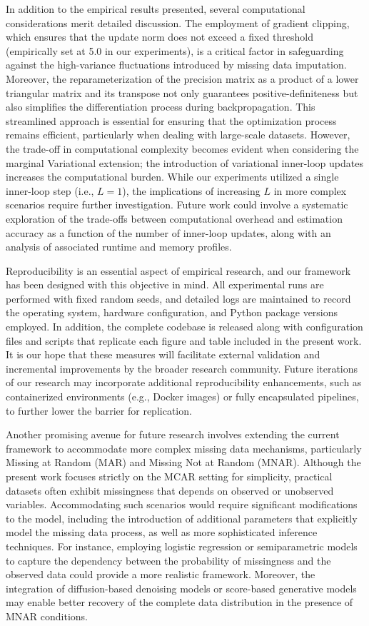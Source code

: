 \documentclass{article}
\begin{document}
In addition to the empirical results presented, several computational considerations merit detailed discussion. The employment of gradient clipping, which ensures that the update norm does not exceed a fixed threshold (empirically set at 5.0 in our experiments), is a critical factor in safeguarding against the high-variance fluctuations introduced by missing data imputation. Moreover, the reparameterization of the precision matrix as a product of a lower triangular matrix and its transpose not only guarantees positive-definiteness but also simplifies the differentiation process during backpropagation. This streamlined approach is essential for ensuring that the optimization process remains efficient, particularly when dealing with large-scale datasets. However, the trade-off in computational complexity becomes evident when considering the marginal Variational extension; the introduction of variational inner-loop updates increases the computational burden. While our experiments utilized a single inner-loop step (i.e., \(L=1\)), the implications of increasing \(L\) in more complex scenarios require further investigation. Future work could involve a systematic exploration of the trade-offs between computational overhead and estimation accuracy as a function of the number of inner-loop updates, along with an analysis of associated runtime and memory profiles.

Reproducibility is an essential aspect of empirical research, and our framework has been designed with this objective in mind. All experimental runs are performed with fixed random seeds, and detailed logs are maintained to record the operating system, hardware configuration, and Python package versions employed. In addition, the complete codebase is released along with configuration files and scripts that replicate each figure and table included in the present work. It is our hope that these measures will facilitate external validation and incremental improvements by the broader research community. Future iterations of our research may incorporate additional reproducibility enhancements, such as containerized environments (e.g., Docker images) or fully encapsulated pipelines, to further lower the barrier for replication.

Another promising avenue for future research involves extending the current framework to accommodate more complex missing data mechanisms, particularly Missing at Random (MAR) and Missing Not at Random (MNAR). Although the present work focuses strictly on the MCAR setting for simplicity, practical datasets often exhibit missingness that depends on observed or unobserved variables. Accommodating such scenarios would require significant modifications to the model, including the introduction of additional parameters that explicitly model the missing data process, as well as more sophisticated inference techniques. For instance, employing logistic regression or semiparametric models to capture the dependency between the probability of missingness and the observed data could provide a more realistic framework. Moreover, the integration of diffusion-based denoising models or score-based generative models may enable better recovery of the complete data distribution in the presence of MNAR conditions.
\end{document}
